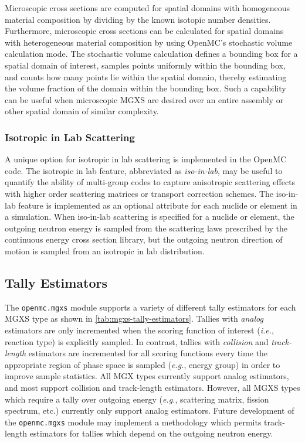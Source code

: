 Microscopic cross sections are computed for spatial domains with homogeneous material composition by dividing by the known isotopic number densities. Furthermore, microscopic cross sections can be calculated for spatial domains with heterogeneous material composition by using OpenMC's stochastic volume calculation mode. The stochastic volume calculation defines a bounding box for a spatial domain of interest, samples points uniformly within the bounding box, and counts how many points lie within the spatial domain, thereby estimating the volume fraction of the domain within the bounding box. Such a capability can be useful when microscopic MGXS are desired over an entire assembly or other spatial domain of similar complexity.

\subsubsection{Isotropic in Lab Scattering}
\label{subsec:iso-in-lab}

A unique option for isotropic in lab scattering is implemented in the OpenMC code. The isotropic in lab feature, abbreviated as \emph{iso-in-lab}, may be useful to quantify the ability of multi-group codes to capture anisotropic scattering effects with higher order scattering matrices or transport correction schemes. The iso-in-lab feature is implemented as an optional attribute for each nuclide or element in a simulation. When iso-in-lab scattering is specified for a nuclide or element, the outgoing neutron energy is sampled from the scattering laws prescribed by the continuous energy cross section library, but the outgoing neutron direction of motion is sampled from an isotropic in lab distribution.

\subsection{Tally Estimators}
\label{subsec:tally-est}

The \texttt{openmc.mgxs} module supports a variety of different tally estimators for each MGXS type as shown in \cref{tab:mgxs-tally-estimators}. Tallies with \textit{analog} estimators are only incremented when the scoring function of interest (\textit{i.e.}, reaction type) is explicitly sampled. In contrast, tallies with \textit{collision} and \textit{track-length} estimators are incremented for all scoring functions every time the appropriate region of phase space is sampled (\textit{e.g.}, energy group) in order to improve sample statistics. All MGX types currently support analog estimators, and most support collision and track-length estimators. However, all MGXS types which require a tally over outgoing energy (\textit{e.g.}, scattering matrix, fission spectrum, etc.) currently only support analog estimators. Future development of the \texttt{openmc.mgxs} module may implement a methodology\cite{nelson2014improved} which permits track-length estimators for tallies which depend on the outgoing neutron energy.

